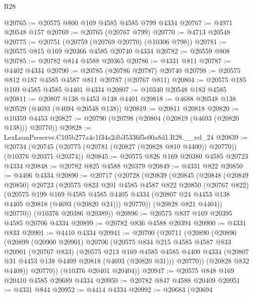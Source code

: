 \begin{lexlean}{R28}
\begin{coremodule}
@20765 := @20575 @800 @169 @4585 @4585 @799 @4334
@20767 := @4971 @20548 @157
@20769 := @20765 (@20767 @799)
@20770 := @4713 @20548
@20775 := @20751 (@20759 (@20769 @20770) (@10306 @798))
@20781 := @20575 @815 @169 @20366 @4585 @20740 @4334
@20782 := @20559 @808
@20785 := @20782 @814 @4588 @20365
@20786 := @4331 @811
@20787 := @4402 @4334
@20790 := @20785 (@20786 @20787) @20740
@20798 := @20575 @812 @187 @4585 @4587 @811 @20787 (@20767 @811)
@20804 := @20575 @185 @169 @4585 @4585 @4401 @4334
@20807 := @10340 @20548 @183 @4585
@20811 := @20807 @138 @4453 @138 @4401
@20818 := @4688 @20548 @138 @20529 (@4693 (@4694 @20548 @138))
@20819 := @20811 @20818
@20820 := @10359 @4453
@20827 := @20790 (@20798 (@20804 (@20819 (@4693 (@20820 @138))) @20770))
@20828 := LexLeanPreserve.C105b277a4c1f34a2db35336f5e00a8d1.R28.__rel_24
@20839 := @20734
    (@20745 (@20775 (@20781 (@20827 (@20828 @810 @4400)) @20770)) (@10376 @20371 @20374))
@20845 := @20575 @826 @169 @20380 @4585 @20723 @4334
@20848 := @20782 @825 @4588 @20379
@20849 := @4331 @822
@20850 := @4406 @4334
@20890 := @20717
    (@20728
      (@20839
        (@20845
          (@20848
            (@20849 @20850)
            @20723
            (@20575
              @823
              @201
              @4585
              @4587
              @822
              @20850
              (@20767 @822)
              (@20575
                @199
                @169
                @4585
                @4585
                @4405
                @4334
                (@20807 @24 @4453 @138 @4405 @20818 (@4693 (@20820 @24)))
                @20770))
            (@20828 @821 @4404))
          @20770))
      (@10376 @20386 @20389))
@20896 := @20575 @837 @169 @20395 @4585 @20706 @4334
@20899 := @20782 @836 @4588 @20394
@20900 := @4331 @833
@20901 := @4410 @4334
@20941 := @20700
    (@20711
      (@20890
        (@20896
          (@20899
            (@20900 @20901)
            @20706
            (@20575
              @834
              @215
              @4585
              @4587
              @833
              @20901
              (@20767 @833)
              (@20575
                @213
                @169
                @4585
                @4585
                @4409
                @4334
                (@20807 @31 @4453 @138 @4409 @20818 (@4693 (@20820 @31)))
                @20770))
            (@20828 @832 @4408))
          @20770))
      (@10376 @20401 @20404))
@20947 := @20575 @848 @169 @20410 @4585 @20689 @4334
@20950 := @20782 @847 @4588 @20409
@20951 := @4331 @844
@20952 := @4414 @4334
@20992 := @20683
    (@20694

\end{coremodule}
\end{lexlean}
